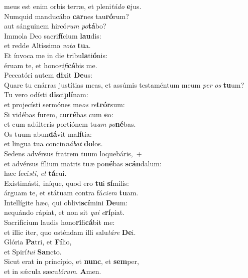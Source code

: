 \oddverse meus est enim orbis terræ, et pleni\textit{tú}\textit{do} \textbf{e}jus.\\
\evenverse Numquid manducábo \textbf{car}nes tau\textbf{ró}rum?~\*\\
\evenverse aut sánguinem hircó\textit{rum} \textit{po}\textbf{tá}bo?\\
\oddverse Immola Deo sacri\textbf{fí}cium \textbf{lau}dis:~\*\\
\oddverse et redde Altíssimo \textit{vo}\textit{ta} \textbf{tu}a.\\
\evenverse Et ínvoca me in die tribu\textbf{la}ti\textbf{ó}nis:~\*\\
\evenverse éruam te, et hono\textit{ri}\textit{fi}\textbf{cá}bis me.\\
\oddverse Peccatóri autem \textbf{di}xit \textbf{De}us:~\*\\
\oddverse Quare tu enárras justítias meas, et assúmis testaméntum meum \textit{per} \textit{os} \textbf{tu}um?\\
\evenverse Tu vero odísti \textbf{di}sci\textbf{plí}nam:~\*\\
\evenverse et projecísti sermónes me\textit{os} \textit{re}\textbf{trór}sum:\\
\oddverse Si vidébas furem, cur\textbf{ré}bas cum \textbf{e}o:~\*\\
\oddverse et cum adúlteris portiónem tu\textit{am} \textit{po}\textbf{né}bas.\\
\evenverse Os tuum abun\textbf{dá}vit ma\textbf{lí}tia:~\*\\
\evenverse et lingua tua concin\textit{ná}\textit{bat} \textbf{do}los.\\
\oddverse Sedens advérsus fratrem tuum loquebáris,~+\\
\oddverse  et advérsus fílium matris tuæ po\textbf{né}bas \textbf{scán}dalum:~\*\\
\oddverse hæc fecí\textit{sti}, \textit{et} \textbf{tá}cui.\\
\evenverse Existimásti, iníque, quod ero \textbf{tu}i \textbf{sí}milis:~\*\\
\evenverse árguam te, et státuam contra fá\textit{ci}\textit{em} \textbf{tu}am.\\
\oddverse Intellígite hæc, qui oblivi\textbf{scí}mini \textbf{De}um:~\*\\
\oddverse nequándo rápiat, et non sit \textit{qui} \textit{e}\textbf{rí}piat.\\
\evenverse Sacrifícium laudis hono\textbf{ri}fi\textbf{cá}bit me:~\*\\
\evenverse et illic iter, quo osténdam illi salu\textit{tá}\textit{re} \textbf{De}i.\\
\oddverse Glória \textbf{Pa}tri, et \textbf{Fí}lio,~\*\\
\oddverse et Spirí\textit{tu}\textit{i} \textbf{San}cto.\\
\evenverse Sicut erat in princípio, et \textbf{nunc}, et \textbf{sem}per,~\*\\
\evenverse et in sǽcula sæcu\textit{ló}\textit{rum}. \textbf{A}men.\\
